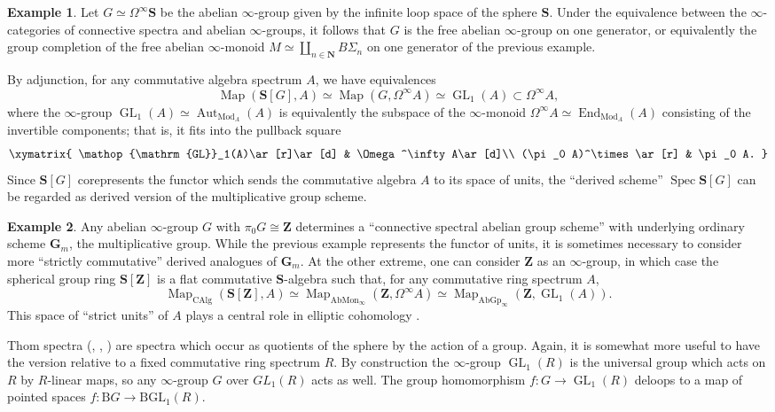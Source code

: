 \documentclass{article}
\theoremstyle{definition}
\newtheorem{example}{Example}[subsection]
\newcommand{\GG}{\mathbf{G}}
\newcommand{\NN}{\mathbf{N}}
\renewcommand{\SS}{\mathbf{S}}
\newcommand{\ZZ}{\mathbf{Z}}
\renewcommand{\i}{\infty}
\DeclareMathOperator{\Mod}{Mod}
\DeclareMathOperator{\CAlg}{CAlg}
\DeclareMathOperator{\Aut}{Aut}
\DeclareMathOperator{\End}{End}
\DeclareMathOperator{\Spec}{Spec}
\DeclareMathOperator{\Map}{Map}
\DeclareMathOperator{\GL}{GL}
\begin{document}
\begin{example}
Let $G\simeq\Omega^\infty\SS$ be the abelian $\infty$-group given by the infinite loop space of the sphere $\SS$.
Under the equivalence between the $\infty$-categories of connective spectra and abelian $\i$-groups, it follows that $G$ is the free abelian $\i$-group on one generator, or equivalently the group completion of the free abelian $\i$-monoid $M\simeq\coprod_{n\in\NN} B\Sigma_n$ on one generator of the previous example.

By adjunction, for any commutative algebra spectrum $A$, we have equivalences
\[
\Map(\SS[G],A)\simeq\Map(G,\Omega^\infty A)\simeq\GL_1(A)\subset\Omega^\infty A,
\]
where the $\infty$-group $\GL_1(A)\simeq\Aut_{\Mod_A}(A)$ is equivalently the subspace of the $\infty$-monoid $\Omega^\infty A\simeq\End_{\Mod_A}(A)$ consisting of the invertible components; that is, it fits into the pullback square
\[
\xymatrix{
\GL_1(A)\ar[r]\ar[d] & \Omega^\infty A\ar[d]\\
(\pi_0 A)^\times\ar[r] & \pi_0 A.
}
\]
Since $\SS[G]$ corepresents the functor which sends the commutative algebra $A$ to its space of units, the ``derived scheme'' $\Spec\SS[G]$ can be regarded as derived version of the multiplicative group scheme.
\end{example}

\begin{example}
Any abelian $\i$-group $G$ with $\pi_0 G\cong\ZZ$ determines a ``connective spectral abelian group scheme'' with underlying ordinary scheme $\GG_m$, the multiplicative group.
While the previous example represents the functor of units, it is sometimes necessary to consider more ``strictly commutative'' derived analogues of $\GG_m$. At the other extreme, one can consider $\ZZ$ as an $\i$-group, in which case the spherical group ring $\SS[\ZZ]$ is a flat commutative $\SS$-algebra such that, for any commutative ring spectrum $A$,
\[
\Map_{\CAlg}(\SS[\ZZ],A)\simeq\Map_{\mathrm{AbMon}_\infty}(\ZZ,\Omega^\infty A)\simeq\Map_{\mathrm{AbGp}_\i}(\ZZ,\GL_1(A)).
\]
This space of ``strict units'' of $A$ plays a central role in elliptic cohomology \cite{EC1}.
\end{example}



Thom spectra (\cite{Thom}, \cite{MQRT}, \cite{ABGHR}) are spectra which occur as quotients of the sphere  by the action of a group.
Again, it is somewhat more useful to have the version relative to a fixed  commutative ring spectrum $R$.
By construction the $\i$-group $\GL_1(R)$ is the universal group which acts on $R$ by $R$-linear maps, so any $\i$-group $G$ over $GL_1(R)$ acts as well.
The group homomorphism $f:G\to\GL_1(R)$ deloops to a map of pointed spaces $f:\mathrm{B}G\to \mathrm{BGL}_1(R)$.
\end{document}
